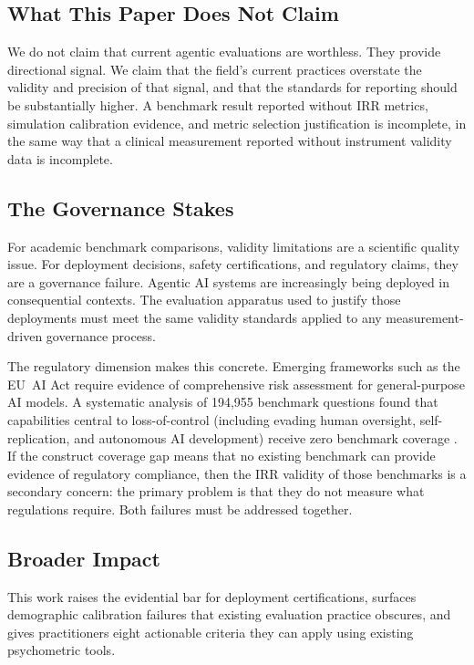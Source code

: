 \documentclass[preprint,12pt]{elsarticle}
\begin{document}
\subsection{What This Paper Does Not Claim}
\label{sec:not-claim}

We do not claim that current agentic evaluations are worthless. They provide
directional signal. We claim that the field's current practices overstate the
validity and precision of that signal, and that the standards for reporting should be
substantially higher. A benchmark result reported without IRR metrics, simulation
calibration evidence, and metric selection justification is incomplete, in the same
way that a clinical measurement reported without instrument validity data is
incomplete.

\subsection{The Governance Stakes}
\label{sec:governance}

For academic benchmark comparisons, validity limitations are a scientific quality
issue. For deployment decisions, safety certifications, and regulatory claims, they
are a governance failure. Agentic AI systems are increasingly being deployed in
consequential contexts. The evaluation apparatus used to justify those deployments
must meet the same validity standards applied to any measurement-driven governance
process.

The regulatory dimension makes this concrete. Emerging frameworks such as the EU~AI
Act require evidence of comprehensive risk assessment for general-purpose AI models.
A systematic analysis of 194,955 benchmark questions found that capabilities central
to loss-of-control (including evading human oversight, self-replication, and
autonomous AI development) receive zero benchmark coverage \citep{prandi2025}. If
the construct coverage gap means that no existing benchmark can provide evidence of
regulatory compliance, then the IRR validity of those benchmarks is a secondary
concern: the primary problem is that they do not measure what regulations require.
Both failures must be addressed together.

\subsection{Broader Impact}
\label{sec:broader-impact}

This work raises the evidential bar for deployment certifications, surfaces
demographic calibration failures that existing evaluation practice obscures, and
gives practitioners eight actionable criteria they can apply using existing
psychometric tools.
\end{document}
